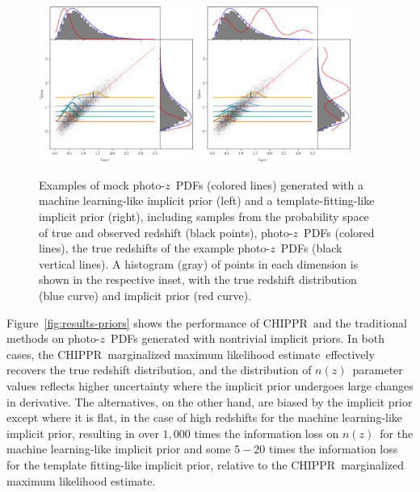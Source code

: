 \documentclass[iop]{emulateapj}
\newcommand{\Fig}[1]{Figure~\ref{#1}}
\newcommand{\project}[1]{{\textsc{#1}}}
\newcommand{\Chippr}{\project{CHIPPR}}
\newcommand{\nz}{$n(z)$}
\newcommand{\pz}{photo-$z$~}
\newcommand{\pzpdf}{\pz PDF}
\newcommand{\mmle}{marginalized maximum likelihood estimate}
\begin{document}
\begin{figure}
	\begin{center}
	\includegraphics[width=0.45\textwidth]{figures/chippr/samplepzs_trpr.png}
	\includegraphics[width=0.45\textwidth]{figures/chippr/samplepzs_tmpr.png}
	\caption{
		Examples of mock \pzpdf s (colored lines) generated with a machine learning-like implicit prior (left) and a template-fitting-like implicit prior (right), including samples from the probability space of true and observed redshift (black points), \pzpdf s (colored lines), the true redshifts of the example \pzpdf s (black vertical lines).
		A histogram (gray) of points in each dimension is shown in the respective inset, with the true redshift distribution (blue curve) and implicit prior (red curve).
	}
	\label{fig:pzs-priors}
	\end{center}
\end{figure}

\Fig{fig:results-priors} shows the performance of \Chippr\ and the traditional methods on \pzpdf s generated with nontrivial implicit priors.
In both cases, the \Chippr\ \mmle\ effectively recovers the true redshift distribution, and the distribution of \nz\ parameter values reflects higher uncertainty where the implicit prior undergoes large changes in derivative.
The alternatives, on the other hand, are biased by the implicit prior except where it is flat, in the case of high redshifts for the machine learning-like implicit prior, resulting in over $1,000$ times the information loss on \nz\ for the machine learning-like implicit prior and some $5-20$ times the information loss for the template fitting-like implicit prior, relative to the \Chippr\ \mmle.
\end{document}
